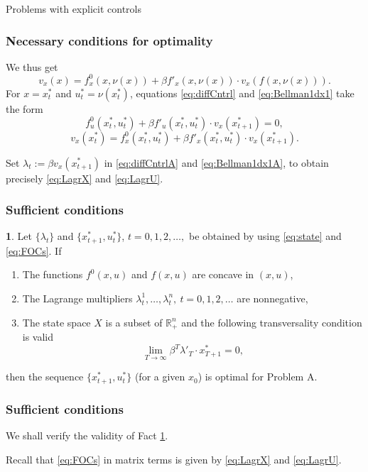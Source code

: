 \documentclass[10pt]{beamer}
\theoremstyle{definition}
\newtheorem{Fact}{\translate{Fact}}
\begin{document}
\begin{section}{Problems with explicit controls}
\begin{frame}[fragile]
\frametitle{Necessary conditions for optimality}
We thus get \begin{equation}
v_x(x) = f^0_x(x,\nu(x)) + \beta  f'_x(x,\nu(x))\cdot v_x(f(x,\nu(x))).
\label{eq:Bellman1dx1}
\end{equation}
For $ x=x^*_t $ and $ u^*_t = \nu(x^*_t) $, equations \eqref{eq:diffCntrl} and \eqref{eq:Bellman1dx1} take the form
\begin{equation}
f^0_u(x^*_t,u^*_t) + \beta f'_u(x^*_t,u^*_t) \cdot v_x(x^*_{t+1}) = 0,
\label{eq:diffCntrlA} 
\end{equation}
\begin{equation}
v_x(x^*_t) = f^0_x(x^*_t,u^*_t) + \beta  f'_x(x^*_t,u^*_t)\cdot v_x(x^*_{t+1}).
\label{eq:Bellman1dx1A}
\end{equation}

Set $ \lambda_t := \beta v_x(x^*_{t+1}) $ in \eqref{eq:diffCntrlA} and \eqref{eq:Bellman1dx1A}, to obtain precisely \eqref{eq:LagrX} and \eqref{eq:LagrU}.
\end{frame}


\begin{frame}[fragile]
\frametitle{Sufficient conditions}
\begin{Fact} Let $\{\lambda_t\}$ and $\{x^*_{t+1},u^*_t\}$,
$t=0,1,2,\ldots,$ be obtained by using \eqref{eq:state}
and \eqref{eq:FOCs}. If 
	\begin{enumerate}
	\item The functions $f^0(x,u)$ and $f(x,u)$
	are concave in $(x,u)$,
	\item The Lagrange multipliers $\lambda_t^1,\ldots,\lambda_t^n,
	~t=0,1,2,\ldots$ are nonnegative,
	\item The state space $X$ is a subset of $\mathbb{R}^n_+$ and the following transversality condition is valid $$\lim_{T\rightarrow \infty} \beta^T \lambda'_T \cdot
	x^*_{T+1}=0,$$
	\end{enumerate} 
then the sequence $\{x^*_{t+1},u^*_t\}$ (for a given $x_0$) is optimal for Problem A.
\label{fc:sufficiency}\end{Fact}
\end{frame}


\begin{frame}[fragile]
\frametitle{Sufficient conditions}
We shall verify the validity of Fact \ref{fc:sufficiency}.\bigskip

Recall that \eqref{eq:FOCs} in matrix terms is given by \eqref{eq:LagrX} and \eqref{eq:LagrU}.


\end{frame}
\end{section}
\end{document}
